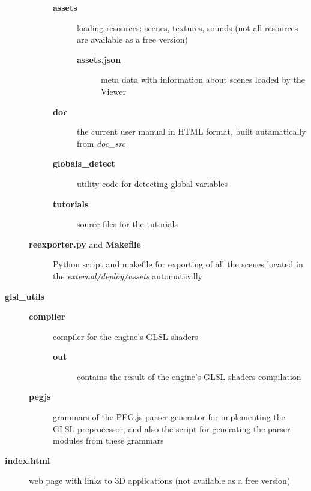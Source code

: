 \documentclass[a4paper,12pt,oneside]{sphinxmanual}
\begin{document}
\begin{description}
\begin{description}
\begin{description}
\item[{\textbf{assets}}] \leavevmode
loading resources: scenes, textures, sounds (not all resources are available as a free version)
\begin{description}
\item[{\textbf{assets.json}}] \leavevmode
meta data with information about scenes loaded by the Viewer

\end{description}

\item[{\textbf{doc}}] \leavevmode
the current user manual in HTML format, built autamatically from \emph{doc\_src}

\item[{\textbf{globals\_detect}}] \leavevmode
utility code for detecting global variables

\item[{\textbf{tutorials}}] \leavevmode
source files for the tutorials

\end{description}

\item[{\textbf{reexporter.py} and \textbf{Makefile}}] \leavevmode
Python script and makefile for exporting of all the scenes located in the \emph{external/deploy/assets} automatically

\end{description}

\item[{\textbf{glsl\_utils}}] \leavevmode\begin{description}
\item[{\textbf{compiler}}] \leavevmode
compiler for the engine's GLSL shaders
\begin{description}
\item[{\textbf{out}}] \leavevmode
contains the result of the engine's GLSL shaders compilation

\end{description}

\item[{\textbf{pegjs}}] \leavevmode
grammars of the PEG.js parser generator for implementing the GLSL preprocessor, and also the script for generating the parser modules from these grammars

\end{description}

\item[{\textbf{index.html}}] \leavevmode
web page with links to 3D applications (not available as a free version)


\end{description}
\end{document}
